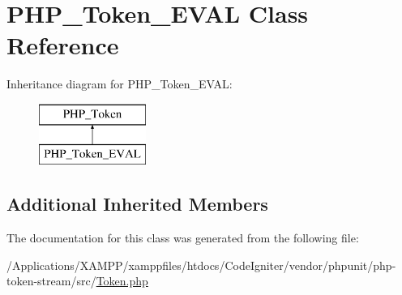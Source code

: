 \hypertarget{class_p_h_p___token___e_v_a_l}{}\section{P\+H\+P\+\_\+\+Token\+\_\+\+E\+V\+AL Class Reference}
\label{class_p_h_p___token___e_v_a_l}
Inheritance diagram for P\+H\+P\+\_\+\+Token\+\_\+\+E\+V\+AL\+:\begin{figure}[H]
\begin{center}
\leavevmode
\includegraphics[height=2.000000cm]{class_p_h_p___token___e_v_a_l}
\end{center}
\end{figure}
\subsection*{Additional Inherited Members}


The documentation for this class was generated from the following file\+:\begin{DoxyCompactItemize}
\item 
/\+Applications/\+X\+A\+M\+P\+P/xamppfiles/htdocs/\+Code\+Igniter/vendor/phpunit/php-\/token-\/stream/src/\mbox{\hyperlink{_token_8php}{Token.\+php}}\end{DoxyCompactItemize}
